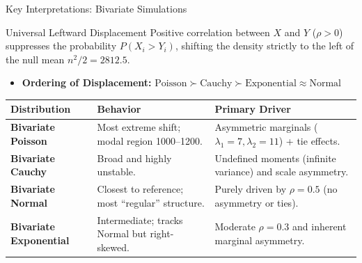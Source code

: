 \documentclass[8pt]{beamer}
\begin{document}
\begin{frame}{Key Interpretations: Bivariate Simulations}
    
    \begin{block}{Universal Leftward Displacement}
        Positive correlation between $X$ and $Y$ ($ \rho > 0 $) suppresses the probability $P(X_i > Y_i)$, shifting the density strictly to the left of the null mean $n^2/2 = 2812.5$.
    \end{block}

    \begin{itemize}
        \item \textbf{Ordering of Displacement:} 
        $\text{Poisson} \succ \text{Cauchy} \succ \text{Exponential} \approx \text{Normal}$
    \end{itemize}

    \vspace{0.2cm}
    \small
    \begin{table}
        \centering
        \begin{tabular}{lp{3.5cm}p{4cm}}
            \toprule
            \textbf{Distribution} & \textbf{Behavior} & \textbf{Primary Driver} \\
            \midrule
            \textbf{Bivariate Poisson} & Most extreme shift; modal region 1000--1200. & Asymmetric marginals ($\lambda_1=7, \lambda_2=11$) + tie effects. \\
            \addlinespace
            \textbf{Bivariate Cauchy} & Broad and highly unstable. & Undefined moments (infinite variance) and scale asymmetry. \\
            \addlinespace
            \textbf{Bivariate Normal} & Closest to reference; most ``regular'' structure. & Purely driven by $\rho=0.5$ (no asymmetry or ties). \\
            \addlinespace
            \textbf{Bivariate Exponential} & Intermediate; tracks Normal but right-skewed. & Moderate $\rho=0.3$ and inherent marginal asymmetry. \\
            \bottomrule
        \end{tabular}
    \end{table}

    \vfill
    \centering
\end{frame}
\end{document}
